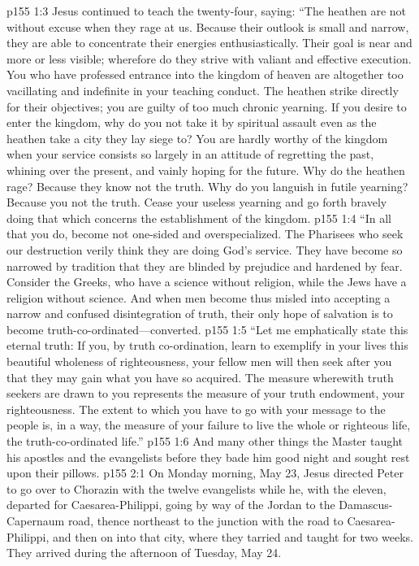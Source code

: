 \vs p155 1:3 Jesus continued to teach the twenty\hyp{}four, saying: \textcolor{ubdarkred}{“The heathen are not without excuse when they rage at us. Because their outlook is small and narrow, they are able to concentrate their energies enthusiastically. Their goal is near and more or less visible; wherefore do they strive with valiant and effective execution. You who have professed entrance into the kingdom of heaven are altogether too vacillating and indefinite in your teaching conduct. The heathen strike directly for their objectives; you are guilty of too much chronic yearning. If you desire to enter the kingdom, why do you not take it by spiritual assault even as the heathen take a city they lay siege to? You are hardly worthy of the kingdom when your service consists so largely in an attitude of regretting the past, whining over the present, and vainly hoping for the future. Why do the heathen rage? Because they know not the truth. Why do you languish in futile yearning? Because you  not the truth. Cease your useless yearning and go forth bravely doing that which concerns the establishment of the kingdom.}
\vs p155 1:4 \textcolor{ubdarkred}{“In all that you do, become not one\hyp{}sided and overspecialized. The Pharisees who seek our destruction verily think they are doing God’s service. They have become so narrowed by tradition that they are blinded by prejudice and hardened by fear. Consider the Greeks, who have a science without religion, while the Jews have a religion without science. And when men become thus misled into accepting a narrow and confused disintegration of truth, their only hope of salvation is to become truth\hyp{}co\hyp{}ordinated---converted.}
\vs p155 1:5 \textcolor{ubdarkred}{“Let me emphatically state this eternal truth: If you, by truth co\hyp{}ordination, learn to exemplify in your lives this beautiful wholeness of righteousness, your fellow men will then seek after you that they may gain what you have so acquired. The measure wherewith truth seekers are drawn to you represents the measure of your truth endowment, your righteousness. The extent to which you have to go with your message to the people is, in a way, the measure of your failure to live the whole or righteous life, the truth\hyp{}co\hyp{}ordinated life.”}
\vs p155 1:6 And many other things the Master taught his apostles and the evangelists before they bade him good night and sought rest upon their pillows.
\vs p155 2:1 On Monday morning, May 23, Jesus directed Peter to go over to Chorazin with the twelve evangelists while he, with the eleven, departed for Caesarea\hyp{}Philippi, going by way of the Jordan to the Damascus\hyp{}Capernaum road, thence northeast to the junction with the road to Caesarea\hyp{}Philippi, and then on into that city, where they tarried and taught for two weeks. They arrived during the afternoon of Tuesday, May 24.
